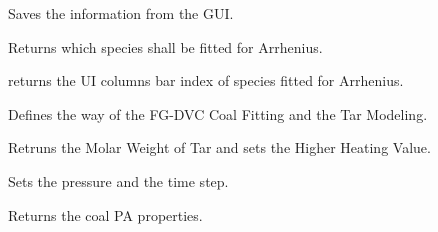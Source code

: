 \documentclass[letterpaper,10pt,english]{sphinxmanual}
\begin{document}
\begin{fulllineitems}
\label{GUI:PKPgui.InfosFromGUI}
Saves the information from the GUI.

\begin{fulllineitems}
\label{GUI:PKPgui.InfosFromGUI.ArrhSpec}
Returns which species shall be fitted for Arrhenius.

\end{fulllineitems}


\begin{fulllineitems}
\label{GUI:PKPgui.InfosFromGUI.ArrhSpecReverse}
returns the UI columns bar index of species fitted for Arrhenius.

\end{fulllineitems}


\begin{fulllineitems}
\label{GUI:PKPgui.InfosFromGUI.FGCoalProp}
Defines the way of the FG-DVC Coal Fitting and the Tar Modeling.

\end{fulllineitems}


\begin{fulllineitems}
\label{GUI:PKPgui.InfosFromGUI.MwsHHV}
Retruns the Molar Weight of Tar and sets the Higher Heating Value.

\end{fulllineitems}


\begin{fulllineitems}
\label{GUI:PKPgui.InfosFromGUI.OperCond}
Sets the pressure and the time step.

\end{fulllineitems}


\begin{fulllineitems}
\label{GUI:PKPgui.InfosFromGUI.PA}
Returns the coal PA properties.


\end{fulllineitems}
\end{fulllineitems}
\end{document}
